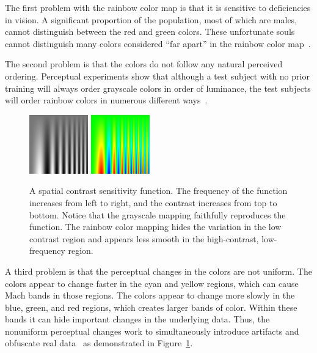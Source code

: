\documentclass{vgtc}                          %
\newcommand{\lcite}[1]{~\cite{#1}}
\begin{document}
The first problem with the rainbow color map is that it is sensitive to
deficiencies in vision.  A significant proportion of the population, most
of which are males, cannot distinguish between the red and green colors.
These unfortunate souls cannot distinguish many colors considered ``far
apart'' in the rainbow color map\lcite{Light04}.

The second problem is that the colors do not follow any natural perceived
ordering.  Perceptual experiments show that although a test subject with
no prior training will always order grayscale colors in order of luminance,
the test subjects will order rainbow colors in numerous different
ways\lcite{Ware04}.

\begin{figure}
  \centering
  \includegraphics[width=1.0in]{images/GrayscaleSpatialContrast}
  \qquad
  \includegraphics[width=1.0in]{images/RainbowSpatialContrast}
  \caption{A spatial contrast sensitivity function.  The frequency of the
    function increases from left to right, and the contrast increases from
    top to bottom.  Notice that the grayscale mapping faithfully reproduces
    the function.  The rainbow color mapping hides the variation in the low
    contrast region and appears less smooth in the high-contrast,
    low-frequency region.}
  \label{fig:RainbowSpatialContrast}
\end{figure}

A third problem is that the perceptual changes in the colors are not
uniform.  The colors appear to change faster in the cyan and yellow
regions, which can cause Mach bands in those regions.  The colors appear to
change more slowly in the blue, green, and red regions, which creates larger
bands of color.  Within these bands it can hide important changes in the
underlying data.  Thus, the nonuniform perceptual changes work to
simultaneously introduce artifacts and obfuscate real
data\lcite{Borland07} as demonstrated in
Figure~\ref{fig:RainbowSpatialContrast}.
\end{document}
